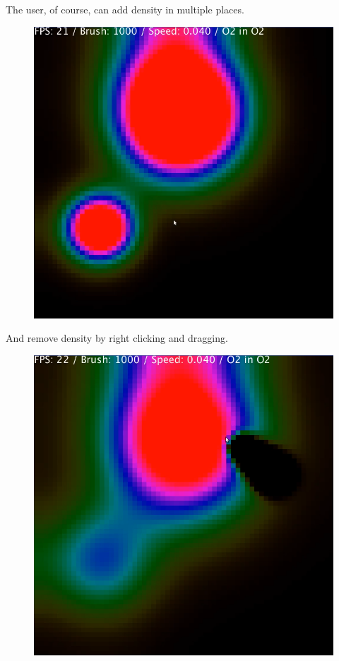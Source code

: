 \documentclass[12pt,a4paper]{book}
\begin{document}
\pagebreak
The user, of course, can add density in multiple places.

\begin{figure}[H]
	\includegraphics[scale=0.5]{pics/3.png}
\end{figure}

\pagebreak
And remove density by right clicking and dragging.

\begin{figure}[H]
	\includegraphics[scale=0.5]{pics/4.png}
\end{figure}
\end{document}
